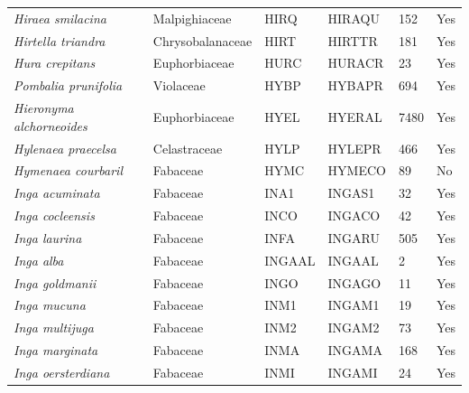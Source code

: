 \documentclass[11pt]{article}
\begin{document}
\begin{longtable}{@{}llllll@{}}
\textit{Hiraea smilacina}                             & Malpighiaceae    & HIRQ   & HIRAQU & 152             & Yes       \\
\textit{Hirtella triandra}                            & Chrysobalanaceae & HIRT   & HIRTTR & 181             & Yes       \\
\textit{Hura crepitans}                               & Euphorbiaceae    & HURC   & HURACR & 23              & Yes       \\
\textit{Pombalia prunifolia}                          & Violaceae        & HYBP   & HYBAPR & 694             & Yes       \\
\textit{Hieronyma alchorneoides}                      & Euphorbiaceae    & HYEL   & HYERAL & 7480            & Yes       \\
\textit{Hylenaea praecelsa}                           & Celastraceae     & HYLP   & HYLEPR & 466             & Yes       \\
\textit{Hymenaea courbaril}                           & Fabaceae         & HYMC   & HYMECO & 89              & No        \\
\textit{Inga acuminata}                               & Fabaceae         & INA1   & INGAS1 & 32              & Yes       \\
\textit{Inga cocleensis}                              & Fabaceae         & INCO   & INGACO & 42              & Yes       \\
\textit{Inga laurina}                                 & Fabaceae         & INFA   & INGARU & 505             & Yes       \\
\textit{Inga alba}                                    & Fabaceae         & INGAAL & INGAAL & 2               & Yes       \\
\textit{Inga goldmanii}                               & Fabaceae         & INGO   & INGAGO & 11              & Yes       \\
\textit{Inga mucuna}                                  & Fabaceae         & INM1   & INGAM1 & 19              & Yes       \\
\textit{Inga multijuga}                               & Fabaceae         & INM2   & INGAM2 & 73              & Yes       \\
\textit{Inga marginata}                               & Fabaceae         & INMA   & INGAMA & 168             & Yes       \\
\textit{Inga oersterdiana}                            & Fabaceae         & INMI   & INGAMI & 24              & Yes       \\

\end{longtable}
\end{document}
